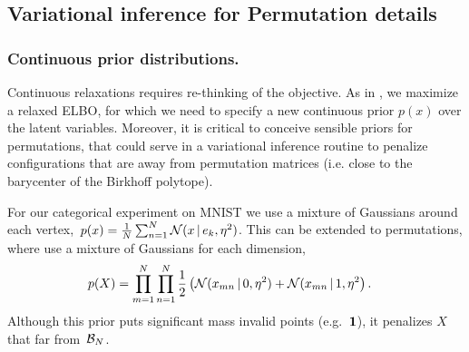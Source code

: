 \documentclass[twoside]{article}
\begin{document}


\subsection*{Variational inference for Permutation details}

\subsubsection*{Continuous prior distributions.} 
Continuous relaxations requires
re-thinking of the objective. As in \cite{maddison2016concrete}, we
maximize a relaxed ELBO, for which we need to specify a new continuous
prior $p(x)$ over the latent variables. Moreover, it is critical to conceive sensible priors for permutations, that could serve in a variational inference routine to penalize configurations that are away from permutation matrices (i.e. close to the barycenter of the Birkhoff polytope).

For our categorical experiment on MNIST we use a mixture of Gaussians around
each vertex,~${p(x) = \tfrac{1}{N} \sum_{n=1}^N \mathcal{N}(x \, | \, e_k, \eta^2)}$. 
This can be extended to permutations, where use a mixture of Gaussians for each
dimension,
\begin{align}
\label{eq:permprior}
  \nonumber p(X) &= \prod_{m=1}^N \prod_{n=1}^N
  \frac{1}{2} \left(\mathcal{N}(x_{mn} \, | \, 0, \eta^2) + \mathcal{N}(x_{mn} \, | \, 1, \eta^2 \right).
  \end{align}
Although this prior puts significant mass invalid points
(e.g.~$\boldsymbol{1}$), it penalizes $X$ that far from~$\mathcal{B}_N$.
\end{document}
